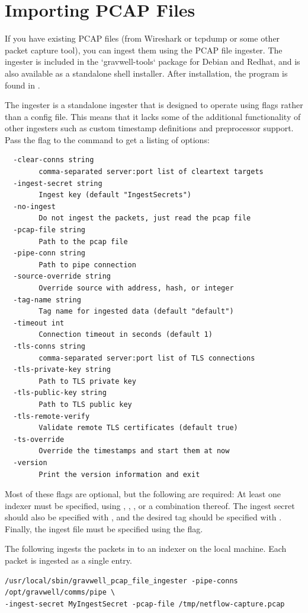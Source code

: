 \section{Importing PCAP Files}
If you have existing PCAP files (from Wireshark or tcpdump or some other packet capture tool), you can ingest them using the PCAP file ingester.  The ingester is included in the `gravwell-tools` package for Debian and Redhat, and is also available as a standalone shell installer. After installation, the program is found in .

The ingester is a standalone ingester that is designed to operate using flags rather than a config file.  This means that it lacks some of the additional functionality of other ingesters such as custom timestamp definitions and preprocessor support.  Pass the  flag to the command to get a listing of options:

\begin{verbatim}
  -clear-conns string
    	comma-separated server:port list of cleartext targets
  -ingest-secret string
    	Ingest key (default "IngestSecrets")
  -no-ingest
    	Do not ingest the packets, just read the pcap file
  -pcap-file string
    	Path to the pcap file
  -pipe-conn string
    	Path to pipe connection
  -source-override string
    	Override source with address, hash, or integer
  -tag-name string
    	Tag name for ingested data (default "default")
  -timeout int
    	Connection timeout in seconds (default 1)
  -tls-conns string
    	comma-separated server:port list of TLS connections
  -tls-private-key string
    	Path to TLS private key
  -tls-public-key string
    	Path to TLS public key
  -tls-remote-verify
    	Validate remote TLS certificates (default true)
  -ts-override
    	Override the timestamps and start them at now
  -version
    	Print the version information and exit
\end{verbatim}

Most of these flags are optional, but the following are required: At least one indexer must be specified, using , , , or a combination thereof. The ingest secret should also be specified with , and the desired tag should be specified with . Finally, the ingest file must be specified using the  flag.

The following ingests the packets in  to an indexer on the local machine. Each packet is ingested as a single entry.

\begin{verbatim}
/usr/local/sbin/gravwell_pcap_file_ingester -pipe-conns /opt/gravwell/comms/pipe \
-ingest-secret MyIngestSecret -pcap-file /tmp/netflow-capture.pcap
\end{verbatim}


